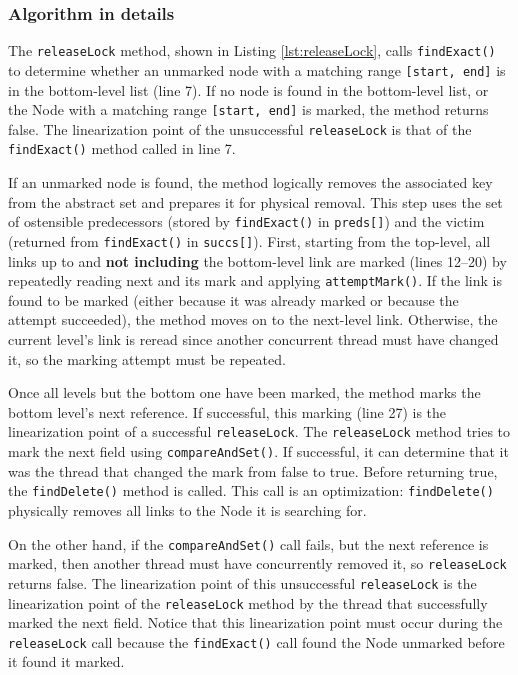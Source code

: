 \subsubsection*{Algorithm in details}

The \texttt{releaseLock} method, shown in Listing \ref{lst:releaseLock}, calls \texttt{findExact()} to determine whether an unmarked node with a matching range \texttt{[start, end]} is in the bottom-level list (line 7). 
If no node is found in the bottom-level list, or the Node with a matching range \texttt{[start, end]} is marked, the method returns false. 
The linearization point of the unsuccessful \texttt{releaseLock} is that of the \texttt{findExact()} method called in line 7. 

If an unmarked node is found, the method logically removes the associated key from the abstract set and prepares it for physical removal. 
This step uses the set of ostensible predecessors (stored by \texttt{findExact()} in \texttt{preds[]}) and the victim (returned from \texttt{findExact()} in \texttt{succs[]}). 
First, starting from the top-level, all links up to and \textbf{not including} the bottom-level link are marked (lines 12--20) by repeatedly reading next and its mark and applying \texttt{attemptMark()}. 
If the link is found to be marked (either because it was already marked or because the attempt succeeded), the method moves on to the next-level link. 
Otherwise, the current level's link is reread since another concurrent thread must have changed it, so the marking attempt must be repeated. 

Once all levels but the bottom one have been marked, the method marks the bottom level's next reference. 
If successful, this marking (line 27) is the linearization point of a successful \texttt{releaseLock}. 
The \texttt{releaseLock} method tries to mark the next field using \texttt{compareAndSet()}. 
If successful, it can determine that it was the thread that changed the mark from false to true. 
Before returning true, the \texttt{findDelete()} method is called. 
This call is an optimization: \texttt{findDelete()} physically removes all links to the Node it is searching for.

On the other hand, if the  \texttt{compareAndSet()} call fails, but the next reference is marked, then another thread must have concurrently removed it, so \texttt{releaseLock} returns false. 
The linearization point of this unsuccessful \texttt{releaseLock} is the linearization point of the \texttt{releaseLock} method by the thread that successfully marked the next field. 
Notice that this linearization point must occur during the \texttt{releaseLock} call because the \texttt{findExact()} call found the Node unmarked before it found it marked.

